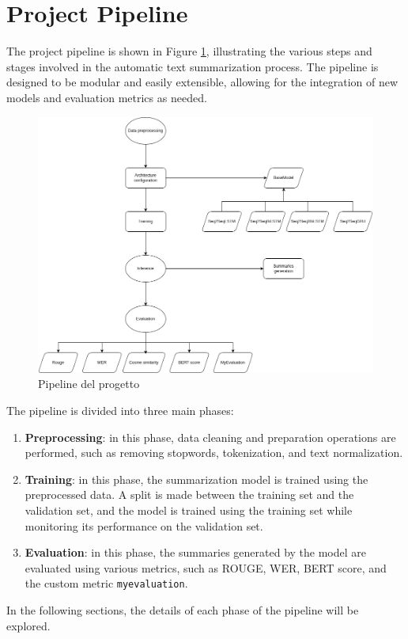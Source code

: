 \section{Project Pipeline}
The project pipeline is shown in Figure \ref{fig:pipeline}, illustrating the various steps and stages involved in the automatic text summarization process. The pipeline is designed to be modular and easily extensible, allowing for the integration of new models and evaluation metrics as needed.

\begin{figure}[H]
    \centering
    \includegraphics[width=1\textwidth]{media/pipeline.png}
    \caption{Pipeline del progetto}
    \label{fig:pipeline}
\end{figure}

The pipeline is divided into three main phases:
\begin{enumerate}
    \item \textbf{Preprocessing}: in this phase, data cleaning and preparation operations are performed, such as removing stopwords, tokenization, and text normalization.
    \item \textbf{Training}: in this phase, the summarization model is trained using the preprocessed data. A split is made between the training set and the validation set, and the model is trained using the training set while monitoring its performance on the validation set.
    \item \textbf{Evaluation}: in this phase, the summaries generated by the model are evaluated using various metrics, such as ROUGE, WER, BERT score, and the custom metric \texttt{myevaluation}.
\end{enumerate}
In the following sections, the details of each phase of the pipeline will be explored.